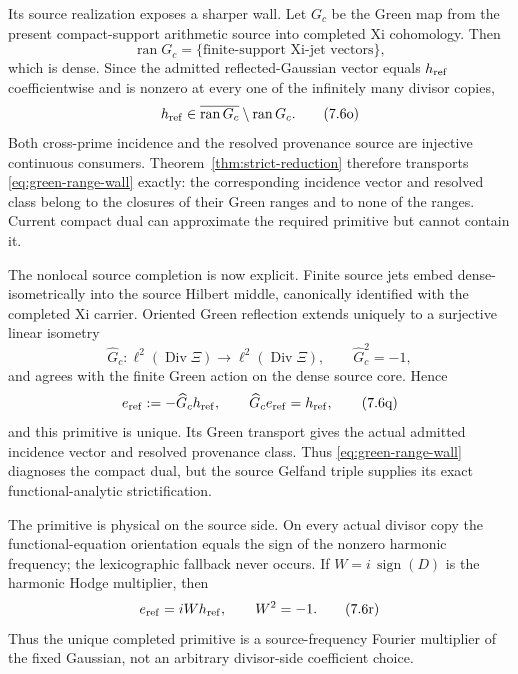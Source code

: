 \documentclass[11pt]{article}
\theoremstyle{definition}
\theoremstyle{remark}
\newcommand{\Div}{\operatorname{Div}}
\begin{document}
Its source realization exposes a sharper wall.  Let \(G_c\) be the Green
map from the present compact-support arithmetic source into completed Xi
cohomology.  Then
\[
 \operatorname{ran}G_c=\{
   \text{finite-support Xi-jet vectors}\},
\tag{7.6n}\label{eq:compact-green-range}
\]
which is dense.  Since the admitted reflected-Gaussian vector equals
\(h_{\rm ref}\) coefficientwise and is nonzero at every one of the
infinitely many divisor copies,
\[
 h_{\rm ref}\in
 \overline{\operatorname{ran}G_c}\setminus\operatorname{ran}G_c.
\tag{7.6o}\label{eq:green-range-wall}
\]
Both cross-prime incidence and the resolved provenance source are
injective continuous consumers.  Theorem~\ref{thm:strict-reduction}
therefore transports \eqref{eq:green-range-wall} exactly: the corresponding
incidence vector and resolved class belong to the closures of their Green
ranges and to none of the ranges.  Current compact dual can approximate the
required primitive but cannot contain it.

The nonlocal source completion is now explicit.  Finite source jets embed
dense-isometrically into the source Hilbert middle, canonically identified
with the completed Xi carrier.  Oriented Green reflection extends uniquely
to a surjective linear isometry
\[
 \widehat G_c:\ell^2(\Div\Xi)\longrightarrow\ell^2(\Div\Xi),
 \qquad \widehat G_c^2=-1,
\tag{7.6p}\label{eq:completed-source-green}
\]
and agrees with the finite Green action on the dense source core.  Hence
\[
 e_{\rm ref}:=-\widehat G_ch_{\rm ref},
 \qquad \widehat G_ce_{\rm ref}=h_{\rm ref},
\tag{7.6q}\label{eq:completed-green-primitive}
\]
and this primitive is unique.  Its Green transport gives the actual admitted
incidence vector and resolved provenance class.  Thus
\eqref{eq:green-range-wall} diagnoses the compact dual, but the source
Gelfand triple supplies its exact functional-analytic strictification.

The primitive is physical on the source side.  On every actual divisor copy
the functional-equation orientation equals the sign of the nonzero harmonic
frequency; the lexicographic fallback never occurs.  If
\(W=i\,\operatorname{sign}(D)\) is the harmonic Hodge multiplier, then
\[
                  e_{\rm ref}=iWh_{\rm ref},
                  \qquad W^2=-1.
\tag{7.6r}\label{eq:harmonic-green-primitive}
\]
Thus the unique completed primitive is a source-frequency Fourier
multiplier of the fixed Gaussian, not an arbitrary divisor-side coefficient
choice.
\end{document}
